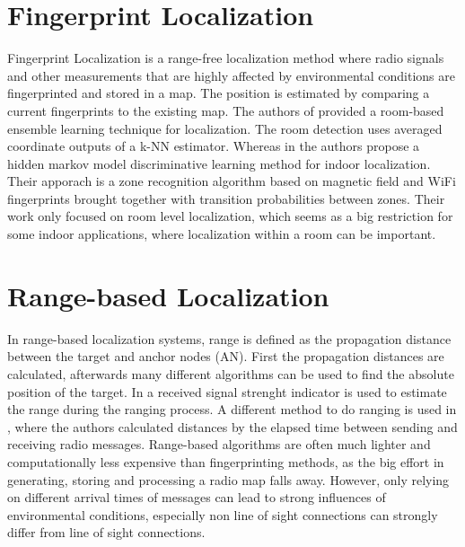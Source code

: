 \section{Fingerprint Localization}
Fingerprint Localization is a range-free localization method where radio signals and other measurements that are highly affected by environmental conditions are fingerprinted and stored in a map. The position is estimated by comparing a current fingerprints to the existing map. The authors of \cite{Taniuchi} provided a room-based ensemble learning technique for localization. The room detection uses averaged coordinate outputs of a k-NN estimator. Whereas in \cite{Carrera2} the authors propose a hidden markov model discriminative learning method for indoor localization. Their apporach is a zone recognition algorithm based on magnetic field and WiFi fingerprints brought together with transition probabilities between zones. Their work only focused on room level localization, which seems as a big restriction for some indoor applications, where localization within a room can be important.

\section{Range-based Localization}
In range-based localization systems, range is defined as the propagation distance between the target and anchor nodes (AN). First the propagation distances are calculated, afterwards many different algorithms can be used to find the absolute position of the target. In \cite{Horus} a received signal strenght indicator is used to estimate the range during the ranging process. A different method to do ranging is used in \cite{IEEE}, where the authors calculated distances by the elapsed time between sending and receiving radio messages. Range-based algorithms are often much lighter and computationally less expensive than fingerprinting methods, as the big effort in generating, storing and processing a radio map falls away. However, only relying on different arrival times of messages can lead to strong influences of environmental conditions, especially non line of sight connections can strongly differ from line of sight connections.

